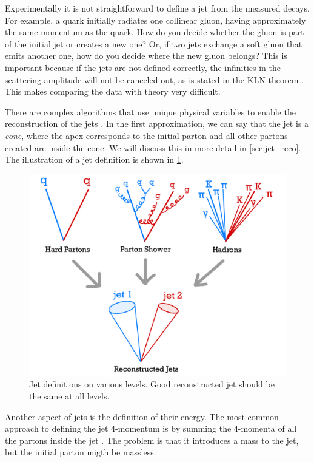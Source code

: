Experimentally it is not straightforward to define a jet from the measured decays.
For example, a quark initially radiates one collinear gluon, having approximately the same momentum as the quark.
How do you decide whether the gluon is part of the initial jet or creates a new one?
Or, if two jets exchange a soft gluon that emits another one, how do you decide where the new gluon belongs?
This is important because if the jets are not defined correctly, the infinities in the scattering amplitude will not be canceled out, as is stated in the KLN theorem \cite{IR_sing_K,IR_sing_LN}.
This makes comparing the data with theory very difficult. 

There are complex algorithms that use unique physical variables to enable the reconstruction of the jets \cite{antikt}.
In the first approximation, we can say that the jet is a \emph{cone}, where the apex corresponds to the initial parton and all other partons created are inside the cone. 
We will discuss this in more detail in \cref{sec:jet_reco}.
The illustration of a jet definition is shown in \cref{fig:jet}.
\begin{figure}[htb]
    \centering
    \includegraphics[width=1.\linewidth]{src/img/jet_reco.jpeg}
    \caption[Jet definitions on various levels.]{Jet definitions on various levels. Good reconstructed jet should be the same at all levels.}
    \label{fig:jet}
\end{figure}

Another aspect of jets is the definition of their energy.
The most common approach to defining the jet 4-momentum is by summing the 4-momenta of all the partons inside the jet \cite{antikt}.
The problem is that it introduces a mass to the jet, but the initial parton migth be massless.


